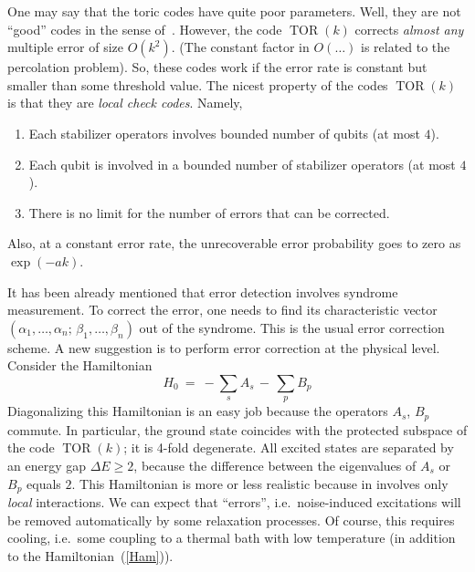 \documentclass[12pt]{article}
\newcommand{\TOR}{\mathop\mathrm{TOR}\nolimits}
\begin{document}
One may say that the toric codes have quite poor parameters. Well, they are 
not ``good'' codes in the sense of~\cite{CaSh}. However, the code 
$\TOR(k)$ corrects \emph{almost any} multiple error of size $O(k^2)$. (The 
constant factor in $O(\ldots)$ is related to the percolation problem). So, 
these codes work if the error rate is constant but smaller than some 
threshold value. The nicest property of the codes $\TOR(k)$ is that they are 
\emph{local check codes}. Namely,
\begin{enumerate}
\item Each stabilizer operators involves bounded number of qubits 
(at most $4$).
\item Each qubit is involved in a bounded number of stabilizer operators
(at most $4$).
\item There is no limit for the number of errors that can be corrected.
\end{enumerate}
Also, at a constant error rate, the unrecoverable error probability goes to 
zero as $\exp(-ak)$.

It has been already mentioned that error detection involves syndrome 
measurement. To correct the error, one needs to find its characteristic vector 
$(\alpha_1,\ldots,\alpha_n;\,\beta_1,\ldots,\beta_n)$ out of the syndrome.
This is the usual error correction scheme. A new suggestion is to perform 
error correction at the physical level. Consider the Hamiltonian
\begin{equation} \label{Ham}
  H_0\ =\ -\sum_s A_s \,-\, \sum_p B_p
\end{equation}
Diagonalizing this Hamiltonian is an easy job because the operators $A_s$, 
$B_p$ commute. In particular, the ground state coincides with the 
protected subspace of the code $\TOR(k)$; it is 4-fold degenerate.
All excited states are separated by an energy gap $\Delta E\ge 2$, because 
the difference between the eigenvalues of $A_s$ or $B_p$ equals $2$. This 
Hamiltonian is more or less realistic because in involves only \emph{local}
interactions. We can expect that ``errors'', i.e.\ noise-induced excitations 
will be removed automatically by some relaxation processes. Of course, this 
requires cooling, i.e.\ some coupling to a thermal bath with low temperature 
(in addition to the Hamiltonian~(\ref{Ham})).
\end{document}
